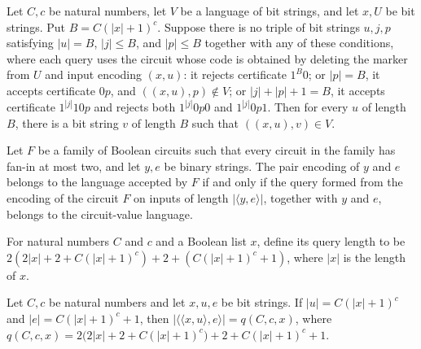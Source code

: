 \begin{theorem}
\label{Complexity.KarpLipton.exists_witness_of_allGood}
\leanok
{}
Let $C,c$ be natural numbers, let $V$ be a language of bit strings, and let $x,U$ be bit
strings. Put $B=C(|x|+1)^c$. Suppose there is no triple of bit strings $u,j,p$ satisfying
$|u|=B$, $|j|\le B$, and $|p|\le B$ together with any of these conditions, where each
query uses the circuit whose code is obtained by deleting the marker from $U$ and input
encoding $(x,u)$: it rejects certificate $1^B0$; or $|p|=B$, it accepts certificate $0p$,
and $((x,u),p)\notin V$; or $|j|+|p|+1=B$, it accepts certificate $1^{|j|}10p$ and
rejects both $1^{|j|}0p0$ and $1^{|j|}0p1$. Then for every $u$ of length $B$, there is a
bit string $v$ of length $B$ such that $((x,u),v)\in V$.
\end{theorem}

\begin{theorem}
\label{Complexity.KarpLipton.query_iff_mem_language}
\leanok
{}
Let $F$ be a family of Boolean circuits such that every circuit in the family has fan-in
at most two, and let $y,e$ be binary strings. The pair encoding of $y$ and $e$ belongs
to the language accepted by $F$ if and only if the query formed from the encoding of the
circuit $F$ on inputs of length $|\langle y,e\rangle|$, together with $y$ and $e$,
belongs to the circuit-value language.
\end{theorem}

\begin{definition}
\label{Complexity.KarpLipton.qlen}
\leanok
For natural numbers $C$ and $c$ and a Boolean list $x$, define its query length to be
$2(2|x|+2+C(|x|+1)^c)+2+(C(|x|+1)^c+1)$, where $|x|$ is the length of $x$.
\end{definition}

\begin{theorem}
\label{Complexity.KarpLipton.length_query}
\leanok
{}
Let $C,c$ be natural numbers and let $x,u,e$ be bit strings. If $|u|=C(|x|+1)^c$ and
$|e|=C(|x|+1)^c+1$, then $|\langle\langle x,u\rangle,e\rangle|=q(C,c,x)$, where
$q(C,c,x)=2\bigl(2|x|+2+C(|x|+1)^c\bigr)+2+C(|x|+1)^c+1$.
\end{theorem}

